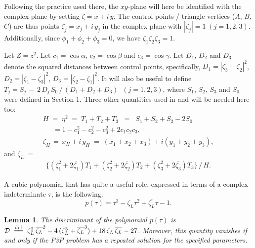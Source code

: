\documentclass[a4paper, twoside]{article}
\newcommand{\defeq}{\overset{\mathrm{def}}{=\joinrel=}}
\newtheorem{lemma}{Lemma}
\begin{document}
Following the practice used there, the $xy$-plane will here be identified with the complex plane by setting $\zeta = x + i \, y$. The control points / triangle vertices ($A$, $B$, $C$) are thus points $\zeta_j = x_j + i \, y_j$ in the complex plane with $| \zeta_j | = 1 \; (j = 1,2,3)$. Additionally, since $\phi_1+\phi_2+\phi_3 = 0$, we have $\zeta_1 \zeta_2 \zeta_3 = 1$. 

Let $Z=z^2$. Let $c_1 = \cos\alpha$, $c_2 = \cos\beta$ and $c_3 = \cos\gamma$. Let $D_1$, $D_2$ and $D_3$ denote the squared distances between control points, specifically, $D_1 = |\zeta_3-\zeta_2|^2$, $D_2 = |\zeta_1-\zeta_3|^2$, $D_3 = |\zeta_2-\zeta_1|^2$. It will also be useful to define $T_j = S_j \, - \, 2 \, D_j \, S_0 \, / \, (D_1+D_2+D_3) \; \; (j = 1,2,3)$, where $S_1$, $S_2$, $S_3$ and $S_0$ were defined in Section 1.
Three other quantities used in \cite{RW} and \cite{R3} will be needed here too: 
$$
\begin{array}{l} 
H \; = \; \eta^2 \; = \; T_1+ T_2+T_3 \; \; = \; \; S_1+S_2+S_2-2 S_0 \\ 
\quad \; \, =  1 - c_1^2 - c_2^2 - c_3^2 + 2 c_1 c_2 c_3 , \\
\zeta_H \, = \, x_H + i \, y_H \; = \; (x_1+x_2+x_3)+i(y_1+y_2+y_3),
\end{array}
$$
\noindent and $\zeta_L \; = $
$$
\begin{array}{l} 
\{ (\zeta_1^2+2\overline{\zeta_1}) T_1 + (\zeta_2^2+2\overline{\zeta_2}) T_2 + (\zeta_3^2+2\overline{\zeta_3}) T_3 \} \, / \, H.
\end{array}
$$

A cubic polynomial that has quite a useful role, expressed in terms of a complex indeterminate $\tau$, is the following: 
$$p(\tau) = \tau^3 - \zeta_L \tau^2 + \overline{\zeta_L} \tau - 1.$$ 

\vspace{2mm}

\begin{lemma}
The discriminant of the polynomial $p(\tau)$ is $\mathcal{D} \; \defeq \; \zeta_L^2 \, \overline{\zeta_L}^2 - 4 \, (\zeta_L^3 + \overline{\zeta_L}^3) + 18 \, \zeta_L \, \overline{\zeta_L} - 27$. Moreover, this quantity vanishes if and only if the P3P problem has a repeated solution for the specified parameters. 
\end{lemma}
\end{document}
